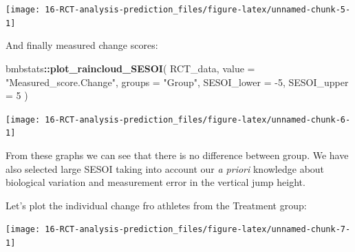 \documentclass[
]{book}
\newenvironment{Shaded}{\begin{snugshade}}{\end{snugshade}}
\newcommand{\DataTypeTok}[1]{\textcolor[rgb]{0.13,0.29,0.53}{#1}}
\newcommand{\DecValTok}[1]{\textcolor[rgb]{0.00,0.00,0.81}{#1}}
\newcommand{\KeywordTok}[1]{\textcolor[rgb]{0.13,0.29,0.53}{\textbf{#1}}}
\newcommand{\NormalTok}[1]{#1}
\newcommand{\OperatorTok}[1]{\textcolor[rgb]{0.81,0.36,0.00}{\textbf{#1}}}
\newcommand{\StringTok}[1]{\textcolor[rgb]{0.31,0.60,0.02}{#1}}
\begin{document}
\begin{center}\texttt{[image: 16-RCT-analysis-prediction\_files/figure-latex/unnamed-chunk-5-1]} \end{center}

And finally measured change scores:

\begin{Shaded}
\begin{Highlighting}[]
\NormalTok{bmbstats}\OperatorTok{::}\KeywordTok{plot\_raincloud\_SESOI}\NormalTok{(}
\NormalTok{  RCT\_data,}
  \DataTypeTok{value =} \StringTok{"Measured\_score.Change"}\NormalTok{,}
  \DataTypeTok{groups =} \StringTok{"Group"}\NormalTok{,}
  \DataTypeTok{SESOI\_lower =} \DecValTok{{-}5}\NormalTok{,}
  \DataTypeTok{SESOI\_upper =} \DecValTok{5}
\NormalTok{)}
\end{Highlighting}
\end{Shaded}

\begin{center}\texttt{[image: 16-RCT-analysis-prediction\_files/figure-latex/unnamed-chunk-6-1]} \end{center}

From these graphs we can see that there is no difference between group. We have also selected large SESOI taking into account our \emph{a priori} knowledge about biological variation and measurement error in the vertical jump height.

Let's plot the individual change fro athletes from the Treatment group:

\begin{Shaded}
\end{Shaded}

\begin{center}\texttt{[image: 16-RCT-analysis-prediction\_files/figure-latex/unnamed-chunk-7-1]} \end{center}
\end{document}
